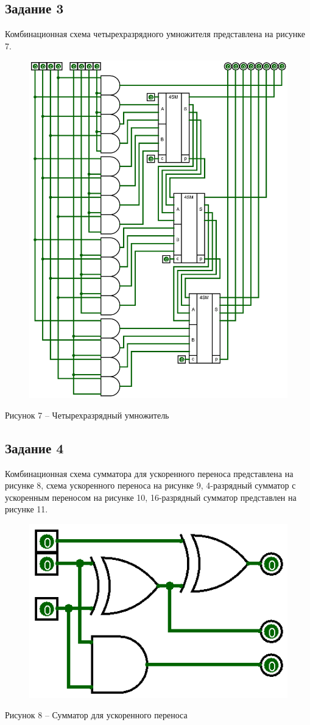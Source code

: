 \documentclass[a4paper,14pt]{extarticle}
\begin{document}
	\subsection*{Задание 3}
	Комбинационная схема четырехразрядного умножителя представлена на рисунке 7.
	\begin{figure}[h]
		\centering
		\includegraphics[width=0.9\linewidth]{images/s-3}
	\end{figure}
	\begin{center}
		Рисунок 7 – Четырехразрядный умножитель
	\end{center}
	
	\pagebreak
	\subsection*{Задание 4}
	Комбинационная схема сумматора для ускоренного переноса представлена на рисунке 8, схема ускоренного переноса на рисунке 9, 4-разрядный сумматор с ускоренным переносом на рисунке 10, 16-разрядный сумматор представлен на рисунке 11.
	
	\begin{figure}[h]
		\centering
		\includegraphics[width=0.35\linewidth]{images/s-4-1}
	\end{figure}
	\begin{center}
		Рисунок 8 – Сумматор для ускоренного переноса
	\end{center}
	
\end{document}
